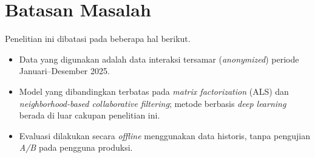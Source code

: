\section{Batasan Masalah}
Penelitian ini dibatasi pada beberapa hal berikut.
\begin{itemize}
  \item Data yang digunakan adalah data interaksi tersamar (\emph{anonymized})
    periode Januari--Desember 2025.
  \item Model yang dibandingkan terbatas pada \emph{matrix factorization}
    (ALS) dan \emph{neighborhood-based collaborative filtering}; metode
    berbasis \emph{deep learning} berada di luar cakupan penelitian ini.
  \item Evaluasi dilakukan secara \emph{offline} menggunakan data historis,
    tanpa pengujian \emph{A/B} pada pengguna produksi.
\end{itemize}
